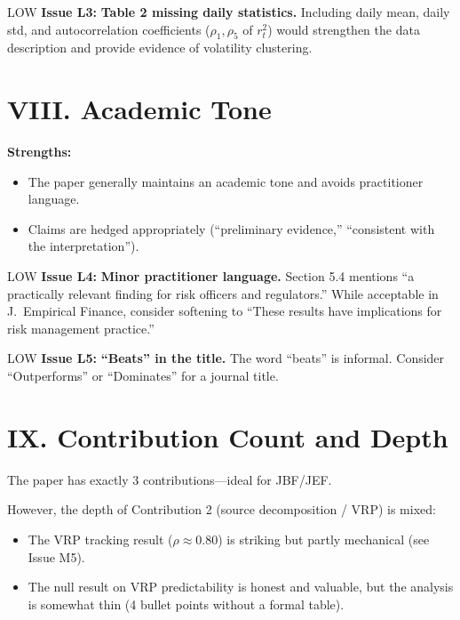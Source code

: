 \documentclass[12pt,a4paper]{article}
\begin{document}
\bigskip

LOW \textbf{Issue L3:} \textbf{Table 2 missing daily statistics.} Including daily mean, daily std, and autocorrelation coefficients ($\rho_1, \rho_5$ of $r_t^2$) would strengthen the data description and provide evidence of volatility clustering.


\section*{VIII. Academic Tone}

\textcolor{okgreen}{\textbf{Strengths:}}
\begin{itemize}
\item The paper generally maintains an academic tone and avoids practitioner language.
\item Claims are hedged appropriately (``preliminary evidence,'' ``consistent with the interpretation'').
\end{itemize}

LOW \textbf{Issue L4:} \textbf{Minor practitioner language.} Section 5.4 mentions ``a practically relevant finding for risk officers and regulators.'' While acceptable in J.\ Empirical Finance, consider softening to ``These results have implications for risk management practice.''

LOW \textbf{Issue L5:} \textbf{``Beats'' in the title.} The word ``beats'' is informal. Consider ``Outperforms'' or ``Dominates'' for a journal title.


\section*{IX. Contribution Count and Depth}

\textcolor{okgreen}{The paper has exactly 3 contributions---ideal for JBF/JEF.}

However, the depth of Contribution 2 (source decomposition / VRP) is mixed:
\begin{itemize}
\item The VRP tracking result ($\rho \approx 0.80$) is striking but partly mechanical (see Issue M5).
\item The null result on VRP predictability is honest and valuable, but the analysis is somewhat thin (4 bullet points without a formal table).
\end{itemize}
\end{document}
